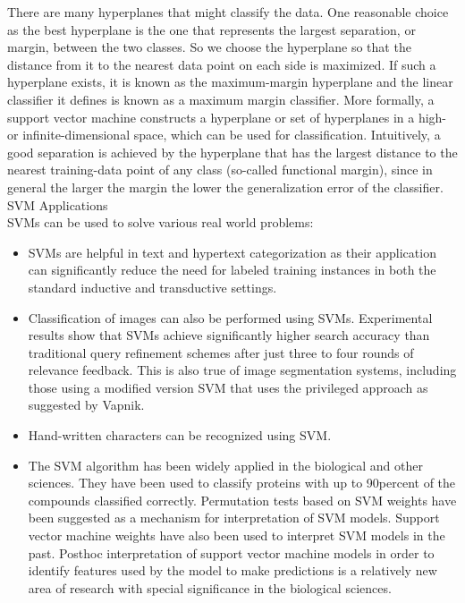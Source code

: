 \documentclass[paper=a4, fontsize=12pt]{scrartcl}
\numberwithin{equation}{section}		%
\numberwithin{figure}{section}			%
\numberwithin{table}{section}				%
\begin{document}
There are many hyperplanes that might classify the data. One reasonable choice as the best hyperplane is the one that represents the largest separation, or margin, between the two classes. So we choose the hyperplane so that the distance from it to the nearest data point on each side is maximized. If such a hyperplane exists, it is known as the maximum-margin hyperplane and the linear classifier it defines is known as a maximum margin classifier.
More formally, a support vector machine constructs a hyperplane or set of hyperplanes in a high- or infinite-dimensional space, which can be used for classification. Intuitively, a good separation is achieved by the hyperplane that has the largest distance to the nearest training-data point of any class (so-called functional margin), since in general the larger the margin the lower the generalization error of the classifier.
\\
SVM Applications
\\
SVMs can be used to solve various real world problems:
\begin{itemize}	
  \item SVMs are helpful in text and hypertext categorization as their application can significantly reduce the need for labeled training instances in both the standard inductive and transductive settings. 
  \item Classification of images can also be performed using SVMs. Experimental results show that SVMs achieve significantly higher search accuracy than traditional query refinement schemes after just three to four rounds of relevance feedback. This is also true of image segmentation systems, including those using a modified version SVM that uses the privileged approach as suggested by Vapnik.
  \item Hand-written characters can be recognized using SVM. 
  \item The SVM algorithm has been widely applied in the biological and other sciences. They have been used to classify proteins with up to 90percent of the compounds classified correctly. Permutation tests based on SVM weights have been suggested as a mechanism for interpretation of SVM models. Support vector machine weights have also been used to interpret SVM models in the past. Posthoc interpretation of support vector machine models in order to identify features used by the model to make predictions is a relatively new area of research with special significance in the biological sciences.
\end{itemize}
\end{document}
